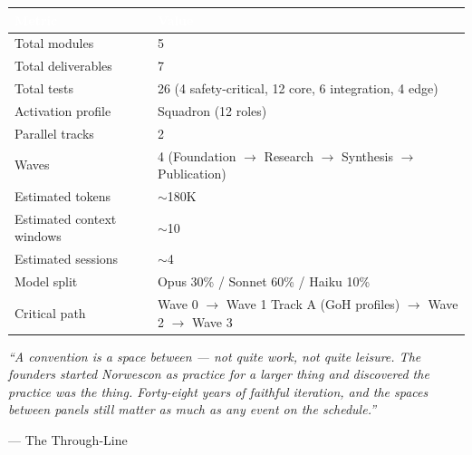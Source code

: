 \documentclass[11pt,letterpaper]{article}
\newcommand{\tableheader}[1]{\textbf{\sffamily\textcolor{white}{#1}}}
\begin{document}
\begin{center}
\begin{tabularx}{\textwidth}{L{5cm}X}
\toprule
{}
\tableheader{Metric} & \tableheader{Value} \\
\midrule
Total modules & 5 \\
Total deliverables & 7 \\
Total tests & 26 (4 safety-critical, 12 core, 6 integration, 4 edge) \\
Activation profile & Squadron (12 roles) \\
Parallel tracks & 2 \\
Waves & 4 (Foundation $\rightarrow$ Research $\rightarrow$ Synthesis $\rightarrow$ Publication) \\
Estimated tokens & $\sim$180K \\
Estimated context windows & $\sim$10 \\
Estimated sessions & $\sim$4 \\
Model split & Opus 30\% / Sonnet 60\% / Haiku 10\% \\
Critical path & Wave 0 $\rightarrow$ Wave 1 Track A (GoH profiles) $\rightarrow$ Wave 2 $\rightarrow$ Wave 3 \\
\bottomrule
\end{tabularx}
\end{center}

\vspace{1em}

\begin{quotebox}
\textit{``A convention is a space between --- not quite work, not quite leisure. The founders started Norwescon as practice for a larger thing and discovered the practice was the thing. Forty-eight years of faithful iteration, and the spaces between panels still matter as much as any event on the schedule.''}

\vspace{0.5em}
\hfill --- The Through-Line
\end{quotebox}
\end{document}
